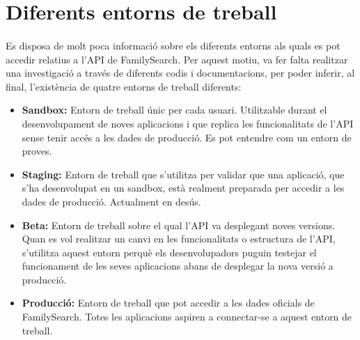 \section{Diferents entorns de treball}

    \paragraph{}
    Es disposa de molt poca informació sobre els diferents entorns als quals es pot accedir relatius a l'API de FamilySearch. Per aquest motiu, va fer falta realitzar una investigació a través de diferents codis i documentacions, per poder inferir, al final, l'existència de quatre entorns de treball diferents:

    \begin{itemize}
        \item \textbf{Sandbox:} Entorn de treball únic per cada usuari. Utilitzable durant el desenvolupament de noves aplicacions i que replica les funcionalitats de l'API sense tenir accés a les dades de producció. Es pot entendre com un entorn de proves.
        \item \textbf{Staging:} Entorn de treball que s'utilitza per validar que una aplicació, que s'ha desenvolupat en un sandbox, està realment preparada per accedir a les dades de producció. Actualment en desús.
        \item \textbf{Beta:} Entorn de treball sobre el qual l'API va desplegant noves versions. Quan es vol realitzar un canvi en les funcionalitats o estructura de l'API, s'utilitza aquest entorn perquè els desenvolupadors puguin testejar el funcionament de les seves aplicacions abans de desplegar la nova versió a producció.
        \item \textbf{Producció:} Entorn de treball que pot accedir a les dades oficials de FamilySearch. Totes les aplicacions aspiren a connectar-se a aquest entorn de treball.
    \end{itemize}
